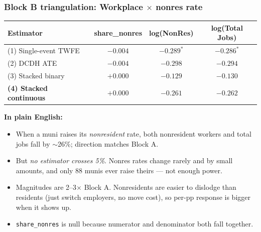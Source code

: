 \documentclass[xcolor = x11names, compress, aspectratio = 169]{beamer}
\renewcommand{\(}{\begin{columns}}
\renewcommand{\)}{\end{columns}}
\newcommand{\<}[1]{\begin{column}{#1}}
\renewcommand{\>}{\end{column}}
\begin{document}
\begin{frame}
\frametitle{Block B triangulation: Workplace $\times$ nonres rate}
    \centering
    \scriptsize
    \renewcommand{\arraystretch}{1.15}
    \setlength{\tabcolsep}{8pt}
    \begin{tabular}{lccc}
        \toprule
        Estimator & share\_nonres & log(NonRes) & log(Total Jobs) \\
        \midrule
        (1) Single-event TWFE & $-0.004$       & $-0.289^{*}$ & $-0.286^{*}$ \\
        (2) DCDH ATE          & $-0.004$       & $-0.298$     & $-0.294$ \\
        (3) Stacked binary    & $+0.000$       & $-0.129$     & $-0.130$ \\
        \textbf{(4) Stacked continuous} & $+0.000$ & $\mathbf{-0.261}$ & $\mathbf{-0.262}$ \\
        \bottomrule
    \end{tabular}
    \vspace{0.10cm}
    \textbf{In plain English:}
    \begin{itemize}\setlength{\itemsep}{0.02cm}\scriptsize
        \item When a muni raises its \emph{nonresident} rate, both nonresident workers and total jobs fall by $\sim$26\%; direction matches Block A.
        \item But \emph{no estimator crosses 5\%}. Nonres rates change rarely and by small amounts, and only 88 munis ever raise theirs --- not enough power.
        \item Magnitudes are 2--3$\times$ Block A. Nonresidents are easier to dislodge than residents (just switch employers, no move cost), so per-pp response is bigger when it shows up.
        \item \texttt{share\_nonres} is null because numerator and denominator both fall together.
    \end{itemize}
\end{frame}

\end{document}
